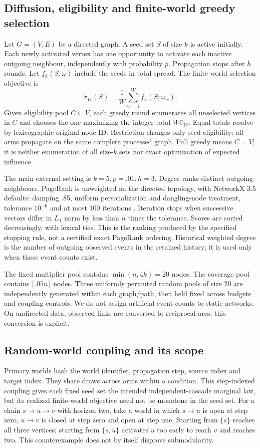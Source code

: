 \documentclass[smallextended]{svjour3}
\begin{document}
\subsection{Diffusion, eligibility and finite-world greedy selection}
Let $G=(V,E)$ be a directed graph. A seed set $S$ of size $k$ is active initially. Each newly activated vertex has one opportunity to activate each inactive outgoing neighbour, independently with probability $p$. Propagation stops after $h$ rounds. Let $f_h(S;\omega)$ include the seeds in total spread. The finite-world selection objective is
\begin{equation}
\widehat\sigma_W(S)=\frac{1}{W}\sum_{w=1}^{W}f_h(S;\omega_w).
\end{equation}
Given eligibility pool $C\subseteq V$, each greedy round enumerates all unselected vertices in $C$ and chooses the one maximizing the integer total $W\widehat\sigma_W$. Equal totals resolve by lexicographic original node ID. Restriction changes only seed eligibility: all arms propagate on the same complete processed graph. Full greedy means $C=V$; it is neither enumeration of all size-$k$ sets nor exact optimization of expected influence.

The main external setting is $k=5,p=.01,h=3$. Degree ranks distinct outgoing neighbours. PageRank is unweighted on the directed topology, with NetworkX 3.5 defaults: damping .85, uniform personalization and dangling-node treatment, tolerance $10^{-6}$ and at most 100 iterations \cite{networkxpr}. Iteration stops when successive vectors differ in $L_1$ norm by less than $n$ times the tolerance. Scores are sorted decreasingly, with lexical ties. This is the ranking produced by the specified stopping rule, not a certified exact PageRank ordering. Historical weighted degree is the number of outgoing observed events in the retained history; it is used only when those event counts exist.

The fixed multiplier pool contains $\min(n,4k)=20$ nodes. The coverage pool contains $\lceil .05n\rceil$ nodes. Three uniformly permuted random pools of size 20 are independently generated within each graph/path, then held fixed across budgets and coupling controls. We do not assign artificial event counts to static networks. On undirected data, observed links are converted to reciprocal arcs; this conversion is explicit.

\subsection{Random-world coupling and its scope}\label{sec:coupling}
Primary worlds hash the world identifier, propagation step, source index and target index. They share draws across arms within a condition. This step-indexed coupling gives each fixed seed set the intended independent-cascade marginal law, but its realized finite-world objective need not be monotone in the seed set. For a chain $s\to u\to v$ with horizon two, take a world in which $s\to u$ is open at step zero, $u\to v$ is closed at step zero and open at step one. Starting from $\{s\}$ reaches all three vertices; starting from $\{s,u\}$ activates $u$ too early to reach $v$ and reaches two. This counterexample does not by itself disprove submodularity.
\end{document}
